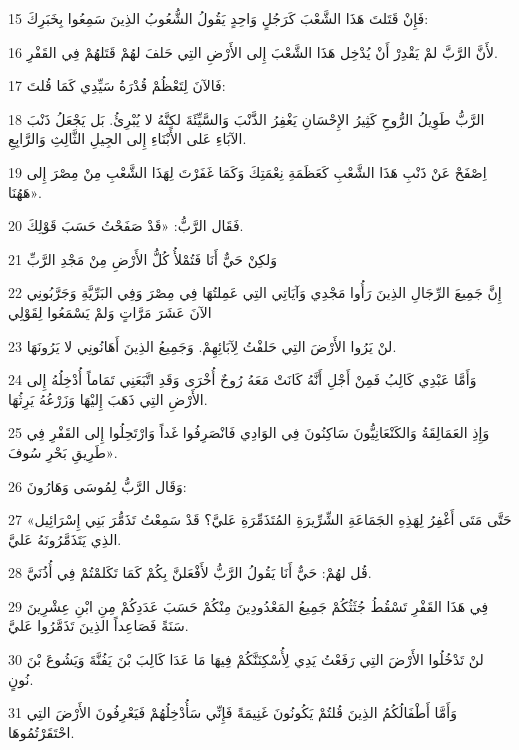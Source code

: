 \par 15 فَإِنْ قَتَلتَ هَذَا الشَّعْبَ كَرَجُلٍ وَاحِدٍ يَقُولُ الشُّعُوبُ الذِينَ سَمِعُوا بِخَبَرِكَ:
\par 16 لأَنَّ الرَّبَّ لمْ يَقْدِرْ أَنْ يُدْخِل هَذَا الشَّعْبَ إِلى الأَرْضِ التِي حَلفَ لهُمْ قَتَلهُمْ فِي القَفْرِ.
\par 17 فَالآنَ لِتَعْظُمْ قُدْرَةُ سَيِّدِي كَمَا قُلتَ:
\par 18 الرَّبُّ طَوِيلُ الرُّوحِ كَثِيرُ الإِحْسَانِ يَغْفِرُ الذَّنْبَ وَالسَّيِّئَةَ لكِنَّهُ لا يُبْرِئُ. بَل يَجْعَلُ ذَنْبَ الآبَاءِ عَلى الأَبْنَاءِ إِلى الجِيلِ الثَّالِثِ وَالرَّابِعِ.
\par 19 اِصْفَحْ عَنْ ذَنْبِ هَذَا الشَّعْبِ كَعَظَمَةِ نِعْمَتِكَ وَكَمَا غَفَرْتَ لِهَذَا الشَّعْبِ مِنْ مِصْرَ إِلى هَهُنَا».
\par 20 فَقَال الرَّبُّ: «قَدْ صَفَحْتُ حَسَبَ قَوْلِكَ.
\par 21 وَلكِنْ حَيٌّ أَنَا فَتُمْلأُ كُلُّ الأَرْضِ مِنْ مَجْدِ الرَّبِّ
\par 22 إِنَّ جَمِيعَ الرِّجَالِ الذِينَ رَأُوا مَجْدِي وَآيَاتِي التِي عَمِلتُهَا فِي مِصْرَ وَفِي البَرِّيَّةِ وَجَرَّبُونِي الآنَ عَشَرَ مَرَّاتٍ وَلمْ يَسْمَعُوا لِقَوْلِي
\par 23 لنْ يَرُوا الأَرْضَ التِي حَلفْتُ لِآبَائِهِمْ. وَجَمِيعُ الذِينَ أَهَانُونِي لا يَرُونَهَا.
\par 24 وَأَمَّا عَبْدِي كَالِبُ فَمِنْ أَجْلِ أَنَّهُ كَانَتْ مَعَهُ رُوحٌ أُخْرَى وَقَدِ اتَّبَعَنِي تَمَاماً أُدْخِلُهُ إِلى الأَرْضِ التِي ذَهَبَ إِليْهَا وَزَرْعُهُ يَرِثُهَا.
\par 25 وَإِذِ العَمَالِقَةُ وَالكَنْعَانِيُّونَ سَاكِنُونَ فِي الوَادِي فَانْصَرِفُوا غَداً وَارْتَحِلُوا إِلى القَفْرِ فِي طَرِيقِ بَحْرِ سُوفَ».
\par 26 وَقَال الرَّبُّ لِمُوسَى وَهَارُونَ:
\par 27 «حَتَّى مَتَى أَغْفِرُ لِهَذِهِ الجَمَاعَةِ الشِّرِّيرَةِ المُتَذَمِّرَةِ عَليَّ؟ قَدْ سَمِعْتُ تَذَمُّرَ بَنِي إِسْرَائِيل الذِي يَتَذَمَّرُونَهُ عَليَّ.
\par 28 قُل لهُمْ: حَيٌّ أَنَا يَقُولُ الرَّبُّ لأَفْعَلنَّ بِكُمْ كَمَا تَكَلمْتُمْ فِي أُذُنَيَّ.
\par 29 فِي هَذَا القَفْرِ تَسْقُطُ جُثَثُكُمْ جَمِيعُ المَعْدُودِينَ مِنْكُمْ حَسَبَ عَدَدِكُمْ مِنِ ابْنِ عِشْرِينَ سَنَةً فَصَاعِداً الذِينَ تَذَمَّرُوا عَليَّ.
\par 30 لنْ تَدْخُلُوا الأَرْضَ التِي رَفَعْتُ يَدِي لِأُسْكِنَنَّكُمْ فِيهَا مَا عَدَا كَالِبَ بْنَ يَفُنَّةَ وَيَشُوعَ بْنَ نُونٍ.
\par 31 وَأَمَّا أَطْفَالُكُمُ الذِينَ قُلتُمْ يَكُونُونَ غَنِيمَةً فَإِنِّي سَأُدْخِلُهُمْ فَيَعْرِفُونَ الأَرْضَ التِي احْتَقَرْتُمُوهَا.
